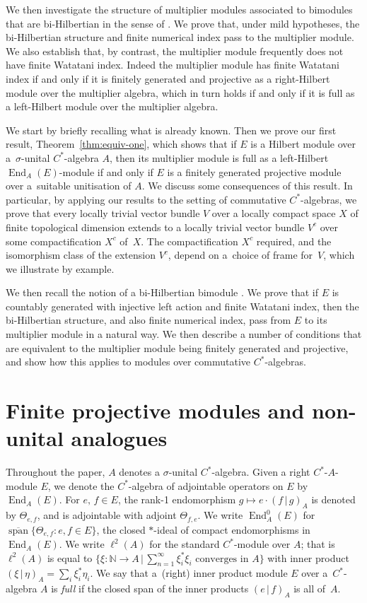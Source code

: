 \documentclass[pdftex]{sigma}
\numberwithin{equation}{section}
\DeclareMathOperator{\End}{End} %
\DeclareMathOperator{\linspan}{span} %
\newcommand{\N}{\mathbb{N}} %
\begin{document}
We then investigate the structure of multiplier modules associated to bimodules that are bi-Hilbertian in the sense of \cite{KajPinWat}. We prove that, under mild hypotheses, the bi-Hilbertian structure and f\/inite numerical index pass to the multiplier module. We also establish that, by contrast, the multiplier module frequently does not have f\/inite Watatani index. Indeed the multiplier module has f\/inite Watatani index if and only if it is f\/initely generated and projective as a right-Hilbert module over the multiplier algebra, which in turn holds if and only if it is full as a left-Hilbert module over the multiplier algebra.

We start by brief\/ly recalling what is already known. Then we prove our f\/irst result, Theo\-rem~\ref{thm:equiv-one}, which shows that if $E$ is a Hilbert module over a~$\sigma$-unital $C^*$-algebra $A$, then its multiplier module is full as a left-Hilbert $\End_A(E)$-module if and only if $E$ is a f\/initely generated projective module over a~suitable unitisation of $A$. We discuss some consequences of this result. In particular, by applying our results to the setting of commutative $C^*$-algebras, we prove that every locally trivial vector bundle $V$ over a locally compact space $X$ of f\/inite topological dimension extends to a locally trivial vector bundle $V^c$ over some compactif\/ication $X^c$ of~$X$. The compactif\/ication $X^c$ required, and the isomorphism class of the extension $V^c$, depend on a~choice of frame for~$V$, which we illustrate by example.

We then recall the notion of a bi-Hilbertian bimodule \cite{KajPinWat}. We prove that if $E$ is countably generated with injective left action and f\/inite Watatani index, then the bi-Hilbertian structure, and also f\/inite numerical index, pass from $E$ to its multiplier module in a natural way. We then describe a number of conditions that are equivalent to the multiplier module being f\/initely generated and projective, and show how this applies to modules over commutative $C^*$-algebras.

\section{Finite projective modules and non-unital analogues}
\label{sec:fgps} Throughout the paper, $A$ denotes a $\sigma$-unital $C^*$-algebra. Given a right $C^*$-$A$-module $E$, we denote the $C^*$-algebra of adjointable operators on $E$ by $\End_A(E)$. For $e,\,f\in E$, the \mbox{rank-1} endomorphism $g \mapsto e \cdot (f \,|\, g)_A$ is denoted by $\Theta_{e,f}$, and is adjointable with adjoint $\Theta_{f,e}$. We write $\End_A^0(E)$ for $\overline{\linspan}\{\Theta_{e,f} \colon e,f \in E\}$, the closed $*$-ideal of compact endomorphisms in $\End_A(E)$. We write $\ell^2(A)$ for the standard $C^*$-module over $A$; that is $\ell^2(A)$ is equal to $\big\{\xi \colon \N \to A \,|\, \sum\limits^\infty_{n=1} \xi_i^*\xi_i\text{ converges in }A\big\}$ with inner product $(\xi \,|\, \eta)_A = \sum_i \xi^*_i \eta_i$. We say that a~(right) inner product module $E$ over a~$C^*$-algebra $A$ is \emph{full} if the closed span of the inner products $(e\,|\, f)_A$ is all of~$A$.
\end{document}
